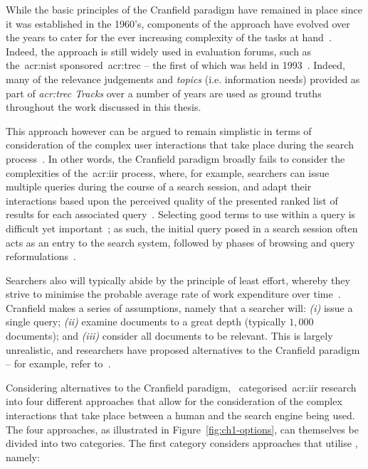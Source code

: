 While the basic principles of the Cranfield paradigm have remained in place since it was established in the 1960's, components of the approach have evolved over the years to cater for the ever increasing complexity of the tasks at hand~\citep{harman2010cranfield}. Indeed, the approach is still widely used in evaluation forums, such as the~\gls{acr:nist} sponsored~\gls{acr:trec} -- the first of which was held in 1993~\citep{harman1993trec1}. Indeed, many of the relevance judgements and \emph{topics} (i.e. information needs) provided as part of \emph{\gls{acr:trec} Tracks} over a number of years are used as ground truths throughout the work discussed in this thesis.

This approach however can be argued to remain simplistic in terms of consideration of the complex user interactions that take place during the search process~\citep{borlund2000evaluation_iir,ingwersen2005theturn}. In other words, the Cranfield paradigm broadly fails to consider the complexities of the~\gls{acr:iir} process, where, for example, searchers can issue multiple queries during the course of a search session, and adapt their interactions based upon the perceived quality of the presented ranked list of results for each associated query~\citep{moffat2013users_versus_models}. Selecting good terms to use within a query is difficult yet important~\citep{efthimiadis2000query_expansion}; as such, the initial query posed in a search session often acts as an entry to the search system, followed by phases of browsing and query reformulations~\citep{marchionini1993information_seeking}.

Searchers also will typically abide by the principle of least effort, whereby they strive to minimise the probable average rate of work expenditure over time~\citep{zipf1949behaviour}. Cranfield makes a series of assumptions, namely that a searcher will: \emph{(i)} issue a single query; \emph{(ii)} examine documents to a great depth (typically $1,000$ documents); and \emph{(iii)} consider all documents to be relevant. This is largely unrealistic, and researchers have proposed alternatives to the Cranfield paradigm -- for example, refer to~\cite{borlund2003iir_model}.

Considering alternatives to the Cranfield paradigm,~\cite{keskustalo2008user_simulation} categorised~\gls{acr:iir} research into four different approaches that allow for the consideration of the complex interactions that take place between a human and the search engine being used. The four approaches, as illustrated in Figure~\ref{fig:ch1-options}, can themselves be divided into two categories. The first category considers approaches that utilise , namely:


